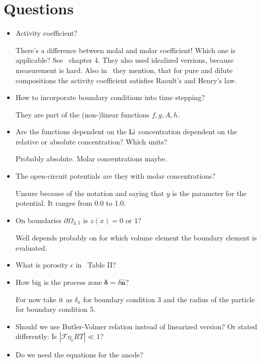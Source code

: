 \documentclass[a4paper,11pt]{scrartcl}
\newcommand*{\Li}{\ce{Li}}
\newcommand*{\F}{\mathcal{F}}
\begin{document}
\section{Questions}
\begin{itemize}
\item Activity coefficient?

  There's a difference between molal and molar coefficient! Which one is applicable?
  See~\cite{doyle95} chapter 4.
  They also used idealized versions, because measurement is hard.
  Also in~\cite{garcia05} they mention, that for pure and dilute compositions
  the activity coefficient satisfies Raoult's and Henry's law.

\item How to incorporate boundary conditions into time stepping?

  They are part of the (non-)linear functions $f, g, A, h$.

\item Are the functions dependent on the $\Li$ concentration dependent on the
  relative or absolute concentration? Which units?

  Probably absolute. Molar concentrations maybe.

\item The open-circuit potentials are they with molar concentrations?

  Unsure because of the  notation and saying that $y$ is the
  parameter for the potential. It ranges from 0.0 to 1.0.

\item On boundaries $\partial\Omega_{3,5}$ is $z(x) = 0$ or $1$?

  Well depends probably on for which volume element the boundary element is evaluated.

\item What is porosity $\epsilon$ in~\cite{garcia05} Table II?

\item How big is the process zone $\boldsymbol{\delta} = \delta \boldsymbol{\hat{n}}$?

  For now take it as $\delta_a$ for boundary condition 3 and the radius of the
  particle for boundary condition 5.

\item Should we use Butler-Volmer relation instead of linearized version?
  Or stated differently: Is $|\F \eta_e R T| \ll 1$?

\item Do we need the equations for the anode?


\end{itemize}
\end{document}
